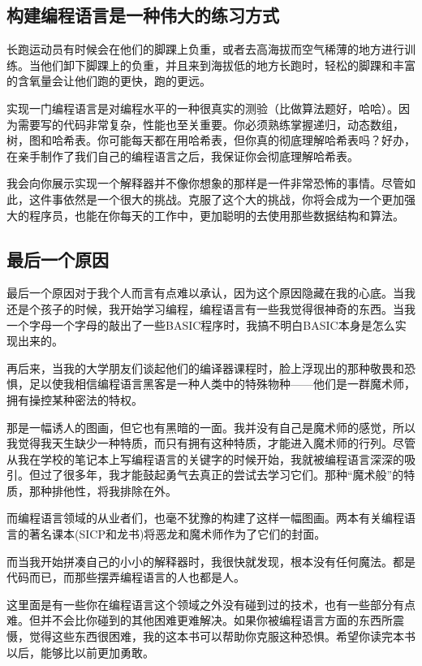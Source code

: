 \documentclass[cn,10pt,math=newtx,citestyle=gb7714-2015,bibstyle=gb7714-2015]{elegantbook}
\begin{document}
\subsection{构建编程语言是一种伟大的练习方式}

长跑运动员有时候会在他们的脚踝上负重，或者去高海拔而空气稀薄的地方进行训练。当他们卸下脚踝上的负重，并且来到海拔低的地方长跑时，轻松的脚踝和丰富的含氧量会让他们跑的更快，跑的更远。

实现一门编程语言是对编程水平的一种很真实的测验（比做算法题好，哈哈）。因为需要写的代码非常复杂，性能也至关重要。你必须熟练掌握递归，动态数组，树，图和哈希表。你可能每天都在用哈希表，但你真的彻底理解哈希表吗？好办，在亲手制作了我们自己的编程语言之后，我保证你会彻底理解哈希表。

我会向你展示实现一个解释器并不像你想象的那样是一件非常恐怖的事情。尽管如此，这件事依然是一个很大的挑战。克服了这个大的挑战，你将会成为一个更加强大的程序员，也能在你每天的工作中，更加聪明的去使用那些数据结构和算法。

\subsection{最后一个原因}

最后一个原因对于我个人而言有点难以承认，因为这个原因隐藏在我的心底。当我还是个孩子的时候，我开始学习编程，编程语言有一些我觉得很神奇的东西。当我一个字母一个字母的敲出了一些BASIC程序时，我搞不明白BASIC本身是怎么实现出来的。

再后来，当我的大学朋友们谈起他们的编译器课程时，脸上浮现出的那种敬畏和恐惧，足以使我相信编程语言黑客是一种人类中的特殊物种——他们是一群魔术师，拥有操控某种密法的特权。

那是一幅诱人的图画，但它也有黑暗的一面。我并没有自己是魔术师的感觉，所以我觉得我天生缺少一种特质，而只有拥有这种特质，才能进入魔术师的行列。尽管从我在学校的笔记本上写编程语言的关键字的时候开始，我就被编程语言深深的吸引。但过了很多年，我才能鼓起勇气去真正的尝试去学习它们。那种“魔术般”的特质，那种排他性，将我排除在外。

\begin{tcolorbox}
而编程语言领域的从业者们，也毫不犹豫的构建了这样一幅图画。两本有关编程语言的著名课本(SICP和龙书)将恶龙和魔术师作为了它们的封面。
\end{tcolorbox}

而当我开始拼凑自己的小小的解释器时，我很快就发现，根本没有任何魔法。都是代码而已，而那些摆弄编程语言的人也都是人。

这里面是有一些你在编程语言这个领域之外没有碰到过的技术，也有一些部分有点难。但并不会比你碰到的其他困难更难解决。如果你被编程语言方面的东西所震慑，觉得这些东西很困难，我的这本书可以帮助你克服这种恐惧。希望你读完本书以后，能够比以前更加勇敢。
\end{document}
